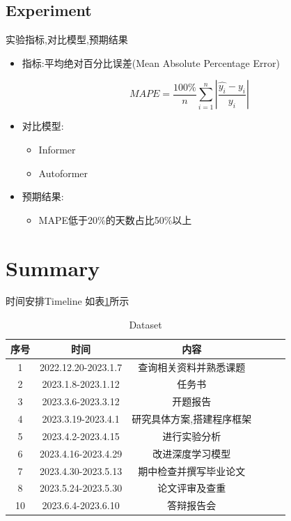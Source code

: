 \documentclass{ctexbeamer}
\begin{document}
\subsection{Experiment}
\begin{frame}{实验}{指标,对比模型,预期结果}
\begin{itemize}
    \item {指标:平均绝对百分比误差(Mean Absolute Percentage Error)}
    \begin{center}
        \begin{equation*}
            MAPE = \frac{100\%}{n} \sum_{i=1}^{n}|\frac{\hat{y_i}-y_i}{y_i}|
        \end{equation*}
    \end{center}  
    \item {对比模型:}
    \begin{itemize}
        \item {Informer}
        \item {Autoformer}
    \end{itemize}
    \item {预期结果:}
    \begin{itemize}
        \item {MAPE低于20\%的天数占比50\%以上}
    \end{itemize}
\end{itemize}
\end{frame}

\section{Summary}
\begin{frame}{时间安排}{Timeline}
    如表\ref{tab2}所示
    \begin{table}
    \centering
    \caption{Dataset}
    \label{tab2}
    \begin{tabular}{cccccc}
    \toprule
    序号 & 时间 & 内容  \\
    \midrule
    1 & 2022.12.20-2023.1.7 & 查询相关资料并熟悉课题  \\
    2 & 2023.1.8-2023.1.12 & 任务书  \\
    3 & 2023.3.6-2023.3.12 & 开题报告  \\
    4 & 2023.3.19-2023.4.1 & 研究具体方案,搭建程序框架  \\
    5 & 2023.4.2-2023.4.15 & 进行实验分析  \\
    6 & 2023.4.16-2023.4.29 & 改进深度学习模型  \\
    7 & 2023.4.30-2023.5.13 & 期中检查并撰写毕业论文  \\
    8 & 2023.5.24-2023.5.30 & 论文评审及查重  \\
    10 & 2023.6.4-2023.6.10 & 答辩报告会  \\
    \bottomrule
    \end{tabular}
    \end{table}
\end{frame}
\end{document}
